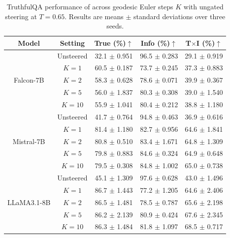 \begin{table}[h!]
\centering
\caption{TruthfulQA performance of \Cobras across geodesic Euler steps $K$ with ungated steering at $T=0.65$. Results are means $\pm$ standard deviations over three seeds.}
\renewcommand{\arraystretch}{1.2}
\small
\begin{tabular}{cccc>{\columncolor{lightpurple!25}}c}
\toprule[1.5pt]
\textbf{Model} & \textbf{Setting} & \textbf{True (\%)}$\uparrow$ & \textbf{Info (\%)}$\uparrow$ & \textbf{T$\times$I (\%)}$\uparrow$ \\
\midrule
\multirow{5}{*}{{Falcon-7B}} & Unsteered & 32.1 {\tiny $\pm$ 0.951} & 96.5 {\tiny $\pm$ 0.283} & 29.1 {\tiny $\pm$ 0.919} \\
 & $K=1$ &  60.5 {\tiny $\pm$ 0.187} & 73.7 {\tiny $\pm$ 0.245} & 37.3 {\tiny $\pm$ 0.883} \\
 & $K=2$ &  58.3 {\tiny $\pm$ 0.628} & 78.6 {\tiny $\pm$ 0.071} & 39.9 {\tiny $\pm$ 0.367} \\
 & $K=5$ &  56.0 {\tiny $\pm$ 1.837} & 80.3 {\tiny $\pm$ 0.308} & 39.0 {\tiny $\pm$ 1.540} \\
 & $K=10$ & 55.9 {\tiny $\pm$ 1.041} & 80.4 {\tiny $\pm$ 0.212} & 38.8 {\tiny $\pm$ 1.180} \\
\midrule
\multirow{5}{*}{{Mistral-7B}} & Unsteered & 41.7 {\tiny $\pm$ 0.764} & 94.8 {\tiny $\pm$ 0.463} & 36.9 {\tiny $\pm$ 0.616} \\
 & $K=1$ &  81.4 {\tiny $\pm$ 1.180} & 82.7 {\tiny $\pm$ 0.956} & 64.6 {\tiny $\pm$ 1.841} \\
 & $K=2$ &  80.8 {\tiny $\pm$ 0.510} & 83.4 {\tiny $\pm$ 1.671} & 64.8 {\tiny $\pm$ 1.309} \\
 & $K=5$ &  79.8 {\tiny $\pm$ 0.883} & 84.6 {\tiny $\pm$ 0.324} & 64.9 {\tiny $\pm$ 0.648} \\
 & $K=10$ &  79.5 {\tiny $\pm$ 0.308} & 84.8 {\tiny $\pm$ 1.002} & 65.0 {\tiny $\pm$ 0.738} \\
\midrule
\multirow{5}{*}{{LLaMA3.1-8B}} & Unsteered & 45.1 {\tiny $\pm$ 1.309} & 97.6 {\tiny $\pm$ 0.628} & 43.0 {\tiny $\pm$ 1.496} \\
 & $K=1$ &  86.7 {\tiny $\pm$ 1.443} & 77.2 {\tiny $\pm$ 1.205} & 64.6 {\tiny $\pm$ 2.406} \\
 & $K=2$ &  86.5 {\tiny $\pm$ 1.481} & 78.5 {\tiny $\pm$ 0.787} & 65.6 {\tiny $\pm$ 2.198} \\
 & $K=5$ &  86.2 {\tiny $\pm$ 2.139} & 80.9 {\tiny $\pm$ 0.424} & 67.6 {\tiny $\pm$ 2.345} \\
 & $K=10$ &  86.3 {\tiny $\pm$ 1.484} & 81.8 {\tiny $\pm$ 1.097} & 68.5 {\tiny $\pm$ 0.717} \\
\bottomrule[1.5pt]
\end{tabular}
\label{tab:cobras_truthfulqa_iters}
\end{table}


